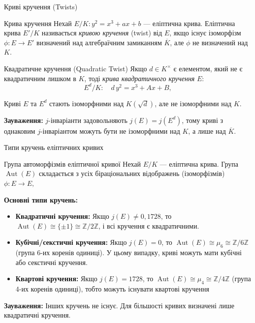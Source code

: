 \documentclass[9pt]{beamer}
\begin{document}
\begin{darkframes}
\begin{frame}{Криві кручення (Twists)}
  \begin{block}{Крива кручення}
    Нехай \(E/K: y^2=x^3+ax+b\) — еліптична крива. Еліптична крива \(E'/K\) називається \emph{кривою кручення} (twist) від \(E\), якщо існує ізоморфізм
    $
    \phi: E \rightarrow E'
    $
    визначений над алгебраїчним замиканням \(\overline{K}\), але \(\phi\) не визначений над \(K\).
  \end{block}
  \begin{block}{Квадратичне кручення (Quadratic Twist)}
    Якщо \(d\in K^\times\) є елементом, який не є квадратичним лишком в \(K\), тоді \emph{крива квадратичного кручення} \(E\):
    \[
    E^d/K: \quad d\,y^2 = x^3 + Ax + B,
    \]

    Криві \(E\) та \(E^d\) стають ізоморфними над \(K(\sqrt{d})\), але не ізоморфними над \(K\).
  \end{block}
  \textbf{Зауваження:} \(j\)-інваріанти задовольняють \(j(E)=j(E^d)\), тому криві з однаковим \(j\)-інваріантом можуть бути не ізоморфними над \(K\), а лише над \(\overline{K}\).
\end{frame}

\begin{frame}{Типи кручень еліптичних кривих}
  \begin{block}{Група автоморфізмів еліптичної кривої}
    Нехай \(E/K\) --- еліптична крива. 
    Група \(\operatorname{Aut}(E)\) складається з усіх біраціональних відображень (ізоморфізмів) 
    $
    \phi: E \to E,
    $

  \end{block}
  \textbf{Основні типи кручень:}
  \begin{itemize}
    \item \textbf{Квадратичні кручення:} Якщо \(j(E) \neq 0, 1728\), то \(\operatorname{Aut}(E)  \cong \{\pm 1\} \cong \mathbb{Z}/2\mathbb{Z}\), і всі кручення є квадратичними. 
    \item \textbf{Кубічні/секстичні кручення:} Якщо \(j(E)=0\), то \(\operatorname{Aut}(E) \cong \mu_6 \cong \mathbb{Z}/6\mathbb{Z}\) (група 6-их коренів одиниці). У цьому випадку, криві можуть мати кубічні або секстичні кручення.
    \item \textbf{Квартові кручення:} Якщо \(j(E)=1728\), то \(\operatorname{Aut}(E) \cong \mu_4 \cong \mathbb{Z}/4\mathbb{Z}\) (група 4-их коренів одиниці), тобто можуть існувати квартові кручення
  \end{itemize}

  \textbf{Зауваження:} Інших кручень не існує. Для більшості кривих визначені лише квадратичні кручення.
\end{frame}



\end{darkframes}
\end{document}
